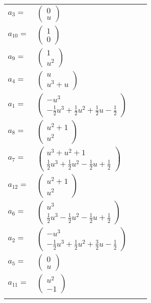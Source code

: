 \documentclass[1p]{elsarticle_modified}
\theoremstyle{definition}
\begin{document}
\begin{tabular}{m{7pt} m{180pt} m{7pt} m{180pt} }
\flushright $a_{3}=$&$\begin{pmatrix}0\\u\end{pmatrix}$ \\
\flushright $a_{10}=$&$\begin{pmatrix}1\\0\end{pmatrix}$ \\
\flushright $a_{9}=$&$\begin{pmatrix}1\\u^2\end{pmatrix}$ \\
\flushright $a_{4}=$&$\begin{pmatrix}u\\u^3+u\end{pmatrix}$ \\
\flushright $a_{1}=$&$\begin{pmatrix}- u^3\\-\frac{1}{2} u^3+\frac{1}{2} u^2+\frac{1}{2} u-\frac{1}{2}\end{pmatrix}$ \\
\flushright $a_{8}=$&$\begin{pmatrix}u^2+1\\u^2\end{pmatrix}$ \\
\flushright $a_{7}=$&$\begin{pmatrix}u^3+u^2+1\\\frac{1}{2} u^3+\frac{1}{2} u^2-\frac{1}{2} u+\frac{1}{2}\end{pmatrix}$ \\
\flushright $a_{12}=$&$\begin{pmatrix}u^2+1\\u^2\end{pmatrix}$ \\
\flushright $a_{6}=$&$\begin{pmatrix}u^3\\\frac{1}{2} u^3-\frac{1}{2} u^2-\frac{1}{2} u+\frac{1}{2}\end{pmatrix}$ \\
\flushright $a_{2}=$&$\begin{pmatrix}- u^3\\-\frac{1}{2} u^3+\frac{1}{2} u^2+\frac{3}{2} u-\frac{1}{2}\end{pmatrix}$ \\
\flushright $a_{5}=$&$\begin{pmatrix}0\\u\end{pmatrix}$ \\
\flushright $a_{11}=$&$\begin{pmatrix}u^2\\-1\end{pmatrix}$\\&\end{tabular}
\end{document}
